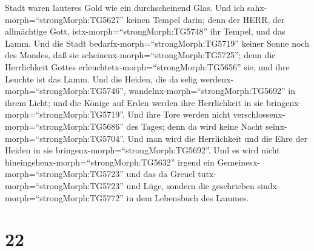 Stadt waren lauteres Gold wie ein durchscheinend Glas.  Und
ich sahx-morph=``strongMorph:TG5627'' keinen Tempel darin; denn der
HERR, der allmächtige Gott, istx-morph=``strongMorph:TG5748'' ihr
Tempel, und das Lamm.  Und die Stadt
bedarfx-morph=``strongMorph:TG5719'' keiner Sonne noch des Mondes, daß
sie scheinenx-morph=``strongMorph:TG5725''; denn die Herrlichkeit Gottes
erleuchtetx-morph=``strongMorph:TG5656'' sie, und ihre Leuchte ist das
Lamm.  Und die Heiden, die da selig
werdenx-morph=``strongMorph:TG5746'',
wandelnx-morph=``strongMorph:TG5692'' in ihrem Licht; und die Könige auf
Erden werden ihre Herrlichkeit in sie
bringenx-morph=``strongMorph:TG5719''.  Und ihre Tore
werden nicht verschlossenx-morph=``strongMorph:TG5686'' des Tages; denn
da wird keine Nacht seinx-morph=``strongMorph:TG5704''. 
Und man wird die Herrlichkeit und die Ehre der Heiden in sie
bringenx-morph=``strongMorph:TG5692''.  Und es wird nicht
hineingehenx-morph=``strongMorph:TG5632'' irgend ein
Gemeinesx-morph=``strongMorph:TG5723'' und das da Greuel
tutx-morph=``strongMorph:TG5723'' und Lüge, sondern die geschrieben
sindx-morph=``strongMorph:TG5772'' in dem Lebensbuch des Lammes.

\hypertarget{section-21}{%
\section{22}\label{section-21}}

